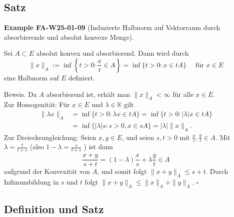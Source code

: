 \documentclass[10pt, letterpaper]{article}
\newcommand{\CustomHeading}[3]{%
  \par\medskip\noindent%
  \textbf{#1 #2} \textnormal{(#3)}.\enskip%
}
\newenvironment{EXA}[2]{\begin{unitbox}\CustomHeading{Example}{#1}{#2}}{\end{unitbox}}
\begin{document}
\subsection*{Satz}


\begin{EXA}{FA-W25-01-09}{Induzierte Halbnorm auf Vektorraum durch absorbierende und absolut konvexe Menge}
Sei $A \subset E$ absolut konvex und absorbierend. Dann wird durch
$$
\|x\|_{A}:=\inf \left\{t>0: \frac{x}{t} \in A\right\}=\inf \{t>0: x \in t A\} \quad \text { für } x \in E
$$
eine Halbnorm auf $E$ definiert.


Beweis. Da $A$ absorbierend ist, erhält man $\|x\|_{A}<\infty$ für alle $x \in E$.\\
Zur Homogenität: Für $x \in E$ und $\lambda \in \mathbb{K}$ gilt
$$
\begin{aligned}
\|\lambda x\|_{A} & =\inf \{t>0: \lambda x \in t A\}=\inf \{t>0:|\lambda| x \in t A\} \\
& =\inf \{|\lambda| s: s>0, x \in s A\}=|\lambda|\|x\|_{A} .
\end{aligned}
$$
Zur Dreiecksungleichung: Seien $x, y \in E$, und seien $s, t>0$ mit $\frac{x}{s}, \frac{y}{t} \in A$. Mit $\lambda=\frac{t}{t+s}$ (also $1-\lambda=\frac{s}{t+s}$ ) ist dann
$$
\frac{x+y}{s+t}=(1-\lambda) \frac{x}{s}+\lambda \frac{y}{t} \in A
$$
aufgrund der Konvexität von $A$, und somit folgt $\|x+y\|_{A} \leq s+t$. Durch Infimumbildung in $s$ und $t$ folgt $\|x+y\|_{A} \leq\|x\|_{A}+\|y\|_{A}$. \(\square\)
\end{EXA}



\subsection*{Definition und Satz}
\end{document}
